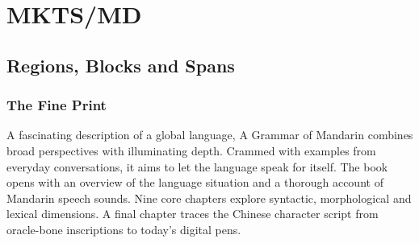 
\begin{multicols}{2}
\mktsShowpar\par
\end{multicols}
\chapter{MKTS/MD
}
\begin{multicols}{2}\end{multicols}
\section{Regions, Blocks and Spans
}
\begin{multicols}{2}
\subsection{The Fine Print
}
A fascinating description of a global language, {\mktsStyleItalic{}A Grammar of Mandarin\/} combines broad perspectives with illuminating depth. Crammed with examples from everyday conversations, it aims to let the language speak for itself. The book opens with an overview of the language situation and a thorough account of Mandarin speech sounds. Nine core chapters explore syntactic, morphological and lexical dimensions. A final chapter traces the Chinese character script from oracle-bone inscriptions to today’s digital pens.\mktsShowpar\par
\end{multicols}
